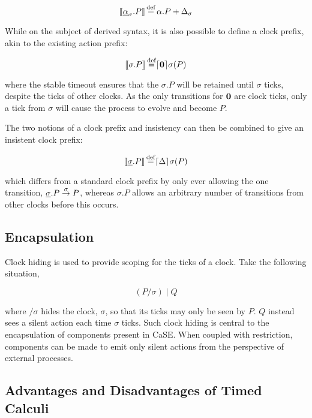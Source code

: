 \begin{equation}
[\hspace{-0.3ex}[ \underline{\alpha}_{\sigma}.P ]\hspace{-0.3ex}] \operatorname{\stackrel{\textrm{def}}{=}} \alpha.P + \Delta_{\sigma} 
\end{equation}

While on the subject of derived syntax, it is also possible to define
a clock prefix, akin to the existing action prefix:

\begin{equation}
[\hspace{-0.3ex}[ \sigma.P ]\hspace{-0.3ex}] \operatorname{\stackrel{\textrm{def}}{=}} \lceil{\textbf{0}}\rceil {\sigma} ({P})
\end{equation}

\noindent where the stable timeout ensures that the $\sigma.P$ will be
retained until $\sigma$ ticks, despite the ticks of other clocks.  As
the only transitions for $\textbf{0}$ are clock ticks, only a tick from
$\sigma$ will cause the process to evolve and become $P$.

The two notions of a clock prefix and insistency can then be combined
to give an insistent clock prefix:

\begin{equation}
[\hspace{-0.3ex}[ \underline{\sigma}.P ]\hspace{-0.3ex}] \operatorname{\stackrel{\textrm{def}}{=}} \lceil{\Delta}\rceil {\sigma} ({P})
\end{equation}

\noindent which differs from a standard clock prefix by only ever
allowing the one transition, $\underline{\sigma}.P \stackrel{\sigma}{\rightarrow}
P$, whereas $\sigma.P$ allows an arbitrary number of transitions from
other clocks before this occurs.

\subsection{Encapsulation}

Clock hiding is used to provide scoping for the ticks of a
clock.  Take the following situation,

\begin{equation}
\label{clockhidingex}
  (P / \sigma)\;|\;Q
\end{equation}

\noindent where $/ \sigma$ hides the clock, $\sigma$, so that its
ticks may only be seen by $P$.  $Q$ instead sees a silent action each
time $\sigma$ ticks.  Such clock hiding is central to the
encapsulation of components present in CaSE.  When coupled with
restriction, components can be made to emit only silent actions from
the perspective of external processes.

\subsection{Advantages and Disadvantages of Timed Calculi}
\label{timelimit}

